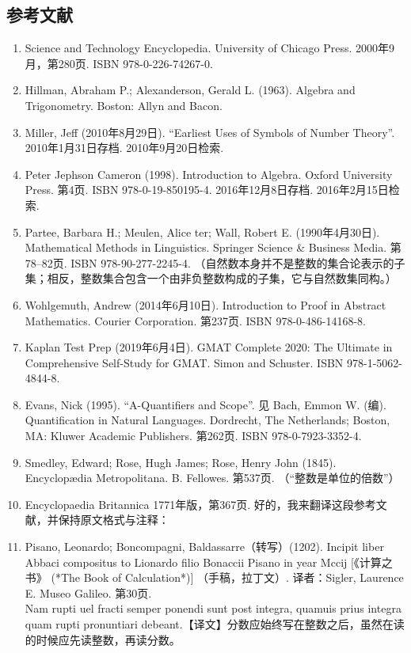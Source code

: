 \subsection{参考文献}
\begin{enumerate}
\item Science and Technology Encyclopedia. University of Chicago Press. 2000年9月，第280页. ISBN 978-0-226-74267-0.
\item Hillman, Abraham P.; Alexanderson, Gerald L. (1963). Algebra and Trigonometry. Boston: Allyn and Bacon.
\item Miller, Jeff (2010年8月29日). “Earliest Uses of Symbols of Number Theory”. 2010年1月31日存档. 2010年9月20日检索.
\item Peter Jephson Cameron (1998). Introduction to Algebra. Oxford University Press. 第4页. ISBN 978-0-19-850195-4. 2016年12月8日存档. 2016年2月15日检索.
\item Partee, Barbara H.; Meulen, Alice ter; Wall, Robert E. (1990年4月30日). Mathematical Methods in Linguistics. Springer Science & Business Media. 第78–82页. ISBN 978-90-277-2245-4. （自然数本身并不是整数的集合论表示的子集；相反，整数集合包含一个由非负整数构成的子集，它与自然数集同构。）
\item Wohlgemuth, Andrew (2014年6月10日). Introduction to Proof in Abstract Mathematics. Courier Corporation. 第237页. ISBN 978-0-486-14168-8.
\item Kaplan Test Prep (2019年6月4日). GMAT Complete 2020: The Ultimate in Comprehensive Self-Study for GMAT. Simon and Schuster. ISBN 978-1-5062-4844-8.
\item Evans, Nick (1995). “A-Quantifiers and Scope”. 见 Bach, Emmon W. (编). Quantification in Natural Languages. Dordrecht, The Netherlands; Boston, MA: Kluwer Academic Publishers. 第262页. ISBN 978-0-7923-3352-4.
\item Smedley, Edward; Rose, Hugh James; Rose, Henry John (1845). Encyclopædia Metropolitana. B. Fellowes. 第537页. （“整数是单位的倍数”）
\item Encyclopaedia Britannica 1771年版，第367页.
好的，我来翻译这段参考文献，并保持原文格式与注释：
\item Pisano, Leonardo; Boncompagni, Baldassarre（转写）(1202). Incipit liber Abbaci compositus to Lionardo filio Bonaccii Pisano in year Mccij [《计算之书》 (*The Book of Calculation*)] （手稿，拉丁文）. 译者：Sigler, Laurence E. Museo Galileo. 第30页.\\
Nam rupti uel fracti semper ponendi sunt post integra, quamuis prius integra quam rupti pronuntiari debeant.【译文】分数应始终写在整数之后，虽然在读的时候应先读整数，再读分数。

\end{enumerate}
